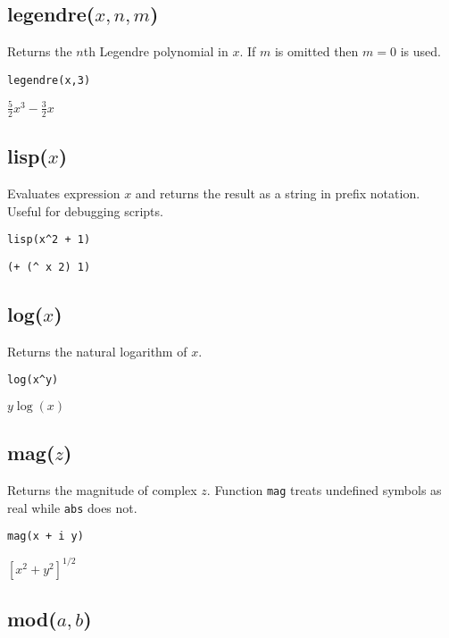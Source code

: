 \subsection*{legendre($x,n,m$)}

Returns the $n$th Legendre polynomial in $x$.
If $m$ is omitted then $m=0$ is used.

{\color{blue}
\begin{verbatim}
legendre(x,3)
\end{verbatim}
}

\noindent
$\displaystyle \tfrac{5}{2}x^3-\tfrac{3}{2}x$

\subsection*{lisp($x$)}

Evaluates expression $x$ and returns the result as a
string in prefix notation.
Useful for debugging scripts.

{\color{blue}
\begin{verbatim}
lisp(x^2 + 1)
\end{verbatim}
}

\noindent
\verb$(+ (^ x 2) 1)$

\subsection*{log($x$)}

Returns the natural logarithm of $x$.

{\color{blue}
\begin{verbatim}
log(x^y)
\end{verbatim}
}

\noindent
$y\log(x)$

\subsection*{mag($z$)}

Returns the magnitude of complex $z$.
Function {\tt mag} treats undefined symbols as real while {\tt abs} does not.

{\color{blue}
\begin{verbatim}
mag(x + i y)
\end{verbatim}
}

\noindent
$\displaystyle \left[x^2+y^2\right]^{1/2}$

\subsection*{mod($a,b$)}

